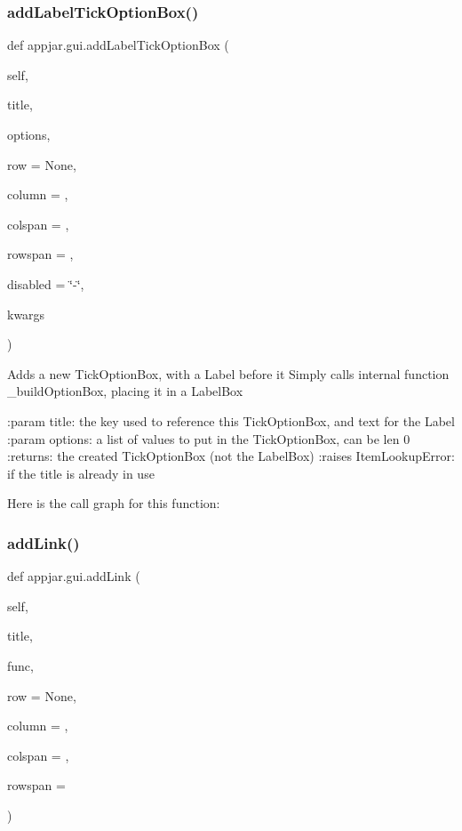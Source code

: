 \subsubsection{\texorpdfstring{add\+Label\+Tick\+Option\+Box()}{addLabelTickOptionBox()}}
{\footnotesize\ttfamily def appjar.\+gui.\+add\+Label\+Tick\+Option\+Box (\begin{DoxyParamCaption}\item[{}]{self,  }\item[{}]{title,  }\item[{}]{options,  }\item[{}]{row = {\ttfamily None},  }\item[{}]{column = {},  }\item[{}]{colspan = {},  }\item[{}]{rowspan = {},  }\item[{}]{disabled = {\ttfamily \char`\"{}-\/\char`\"{}},  }\item[{}]{kwargs }\end{DoxyParamCaption})}

\begin{DoxyVerb}Adds a new TickOptionBox, with a Label before it
Simply calls internal function _buildOptionBox, placing it in a LabelBox

:param title: the key used to reference this TickOptionBox, and text for the Label
:param options: a list of values to put in the TickOptionBox, can be len 0
:returns: the created TickOptionBox (not the LabelBox)
:raises ItemLookupError: if the title is already in use
\end{DoxyVerb}
 Here is the call graph for this function\+:
\mbox{\label{classappjar_1_1gui_a226308bc36e5801c4ffea3d0ad1df9d4}} 
\subsubsection{\texorpdfstring{add\+Link()}{addLink()}}
{\footnotesize\ttfamily def appjar.\+gui.\+add\+Link (\begin{DoxyParamCaption}\item[{}]{self,  }\item[{}]{title,  }\item[{}]{func,  }\item[{}]{row = {\ttfamily None},  }\item[{}]{column = {},  }\item[{}]{colspan = {},  }\item[{}]{rowspan = {} }\end{DoxyParamCaption})}


